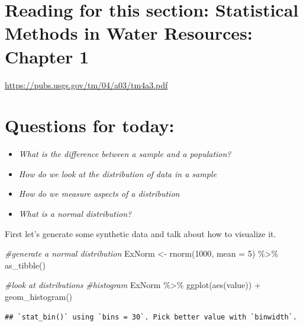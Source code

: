 \documentclass[
]{book}
\newenvironment{Shaded}{\begin{snugshade}}{\end{snugshade}}
\newcommand{\AttributeTok}[1]{\textcolor[rgb]{0.77,0.63,0.00}{#1}}
\newcommand{\CommentTok}[1]{\textcolor[rgb]{0.56,0.35,0.01}{\textit{#1}}}
\newcommand{\DecValTok}[1]{\textcolor[rgb]{0.00,0.00,0.81}{#1}}
\newcommand{\FunctionTok}[1]{\textcolor[rgb]{0.00,0.00,0.00}{#1}}
\newcommand{\NormalTok}[1]{#1}
\newcommand{\OtherTok}[1]{\textcolor[rgb]{0.56,0.35,0.01}{#1}}
\newcommand{\SpecialCharTok}[1]{\textcolor[rgb]{0.00,0.00,0.00}{#1}}
\providecommand{\tightlist}{%
  \setlength{\itemsep}{0pt}\setlength{\parskip}{0pt}}
\begin{document}
\hypertarget{reading-for-this-section-statistical-methods-in-water-resources-chapter-1}{%
\section{Reading for this section: Statistical Methods in Water Resources: Chapter 1}\label{reading-for-this-section-statistical-methods-in-water-resources-chapter-1}}

\url{https://pubs.usgs.gov/tm/04/a03/tm4a3.pdf}

\hypertarget{questions-for-today}{%
\section{Questions for today:}\label{questions-for-today}}

\begin{itemize}
\tightlist
\item
  \emph{What is the difference between a sample and a population?}
\item
  \emph{How do we look at the distribution of data in a sample}
\item
  \emph{How do we measure aspects of a distribution}
\item
  \emph{What is a normal distribution?}
\end{itemize}

First let's generate some synthetic data and talk about how to visualize it.

\begin{Shaded}
\begin{Highlighting}[]
\CommentTok{\#generate a normal distribution}
\NormalTok{ExNorm }\OtherTok{\textless{}{-}} \FunctionTok{rnorm}\NormalTok{(}\DecValTok{1000}\NormalTok{, }\AttributeTok{mean =} \DecValTok{5}\NormalTok{) }\SpecialCharTok{\%\textgreater{}\%} 
  \FunctionTok{as\_tibble}\NormalTok{()}

\CommentTok{\#look at distributions}
\CommentTok{\#histogram}
\NormalTok{ExNorm }\SpecialCharTok{\%\textgreater{}\%}
  \FunctionTok{ggplot}\NormalTok{(}\FunctionTok{aes}\NormalTok{(value)) }\SpecialCharTok{+}
  \FunctionTok{geom\_histogram}\NormalTok{()}
\end{Highlighting}
\end{Shaded}

\begin{verbatim}
## `stat_bin()` using `bins = 30`. Pick better value with `binwidth`.
\end{verbatim}
\end{document}
